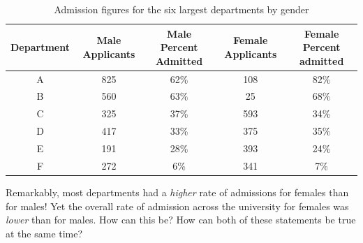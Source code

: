\documentclass[
]{book}
\begin{document}
\begin{table}

\caption{\label{tab:simpsontable}Admission figures for the six largest departments by gender}
\centering
\begin{tabular}[t]{c|c|c|c|c}
\hline
Department & Male Applicants & Male Percent Admitted & Female Applicants & Female Percent admitted\\
\hline
A & 825 & 62\% & 108 & 82\%\\
\hline
B & 560 & 63\% & 25 & 68\%\\
\hline
C & 325 & 37\% & 593 & 34\%\\
\hline
D & 417 & 33\% & 375 & 35\%\\
\hline
E & 191 & 28\% & 393 & 24\%\\
\hline
F & 272 & 6\% & 341 & 7\%\\
\hline
\end{tabular}
\end{table}

Remarkably, most departments had a \emph{higher} rate of admissions for females than for males! Yet the overall rate of admission across the university for females was \emph{lower} than for males. How can this be? How can both of these statements be true at the same time?
\end{document}
